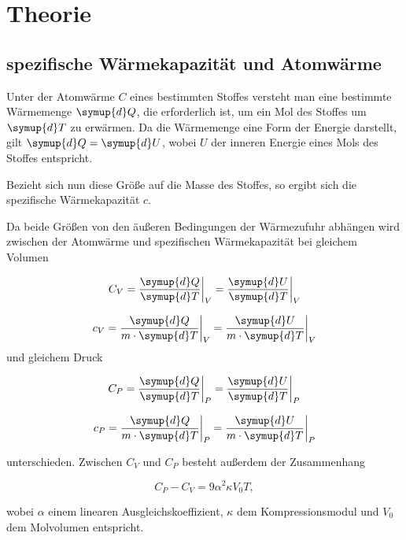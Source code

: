 \section{Theorie}
\label{sec:Theorie}

\subsection{spezifische Wärmekapazität und Atomwärme}
Unter der Atomwärme $C$ eines bestimmten Stoffes 
versteht man eine bestimmte
Wärmemenge $\symup{d}Q$, die erforderlich ist, um
ein Mol des Stoffes um $\symup{d}T$ zu erwärmen.
Da die Wärmemenge eine Form der Energie darstellt,
gilt $\symup{d}Q = \symup{d}U$, wobei $U$ der
inneren Energie eines Mols des Stoffes entspricht.


\noindent Bezieht sich nun diese Größe auf die Masse des Stoffes,
so ergibt sich die spezifische Wärmekapazität $c$.


\noindent Da beide Größen von den äußeren Bedingungen der
Wärmezufuhr abhängen wird zwischen der Atomwärme
und spezifischen Wärmekapazität bei gleichem Volumen

\begin{equation}
    C_V=\frac{\symup{d}Q}{\symup{d}T}\biggr|_V=\frac{\symup{d}U}{\symup{d}T}\biggr|_V
    \label{eq:b}
\end{equation}

\begin{equation}
    c_V=\frac{\symup{d}Q}{m \cdot \symup{d}T}\biggr|_V=\frac{\symup{d}U}{m \cdot \symup{d}T}\biggr|_V
\end{equation}
\noindent und gleichem Druck

\begin{equation}
    C_P=\frac{\symup{d}Q}{\symup{d}T}\biggr|_P=\frac{\symup{d}U}{\symup{d}T}\biggr|_P
\end{equation}

\begin{equation}
    c_P=\frac{\symup{d}Q}{m \cdot \symup{d}T}\biggr|_P=\frac{\symup{d}U}{m \cdot \symup{d}T}\biggr|_P
\end{equation}

\noindent unterschieden. Zwischen $C_V$ und $C_P$
besteht außerdem der Zusammenhang

\begin{equation}
    C_P-C_V=9\alpha^2\kappa V_0T,
\end{equation}

wobei $\alpha$ einem linearen Ausgleichskoeffizient,
$\kappa$ dem Kompressionsmodul und $V_0$ dem Molvolumen entspricht.




